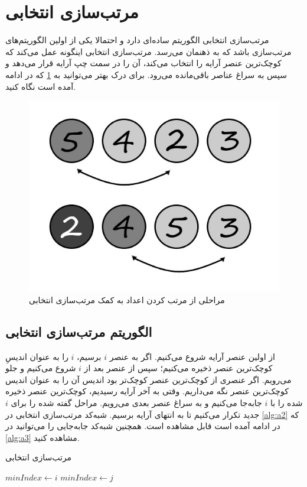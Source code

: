 \documentclass[12pt]{article}
\begin{document}
\section{مرتب‌سازی انتخابی\protect{}}

مرتب‌سازی انتخابی الگوریتم ساده‌ای دارد و
احتمالا یکی از اولین الگوریتم‌های مرتب‌سازی باشد که به ذهنمان می‌رسد.
مرتب‌سازی انتخابی اینگونه عمل می‌کند که کوچک‌ترین عنصر آرایه را انتخاب می‌کند، آن را در سمت چپ آرایه قرار می‌دهد
و سپس به سراغ عناصر باقی‌مانده می‌رود.
\cite{clrs}
برای درک بهتر می‌توانید به
\cref{fig:f2}
که در ادامه آمده است
نگاه کنید.

\begin{figure}[H]
  \centering
  \includegraphics[width=.65\textwidth]{figs/selectionSort.jpg}
  \caption{
    مراحلی از مرتب کردن اعداد به کمک مرتب‌سازی انتخابی
  }
  \label{fig:f2}
\end{figure}

\subsection*{الگوریتم مرتب‌سازی انتخابی}
از اولین عنصر آرایه شروع می‌کنیم. اگر به عنصر
$i$
برسیم،
$i$
را به عنوان اندیسِ
کوچک‌ترین عنصر ذخیره می‌کنیم؛
سپس از عنصر بعد از
$i$
شروع می‌کنیم و جلو می‌رویم.
اگر عنصری از
کوچک‌ترین عنصر
کوچک‌تر بود
اندیس آن را به عنوان اندیس کوچک‌ترین عنصر نگه می‌داریم.
وقتی به آخر آرایه رسیدیم،
کوچک‌ترین عنصر ذخیره شده را با
$i$
جابه‌جا
می‌کنیم
و به سراغ عنصر بعدی می‌رویم.
مراحل گفته شده را برای
$i$
جدید تکرار می‌کنیم
تا به انتهای آرایه برسیم.
شبه‌کد مرتب‌سازی انتخابی در
\cref{alg:a2}
که در ادامه آمده است قابل مشاهده است.
همچنین شبه‌کد جابه‌جایی را می‌توانید در
\cref{alg:a3}
مشاهده کنید.

\begin{algorithm}[H]
  \caption{مرتب‌سازی انتخابی}
  \label{alg:a2}
  \begin{latin}
    \begin{algorithmic}[1]
      \State $minIndex \gets i$
      \State $minIndex \gets j$
      \EndIf
      \EndFor
      \State {}
      \EndFor
      \EndProcedure
    \end{algorithmic}
  \end{latin}
\end{algorithm}
\end{document}
